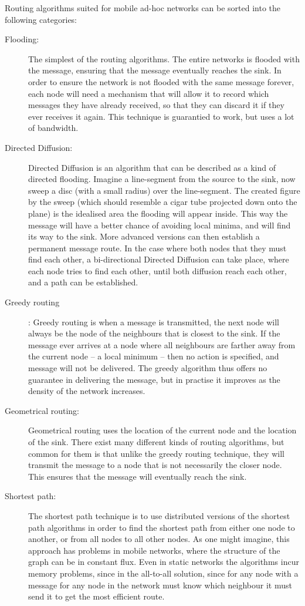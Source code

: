 \documentclass[letter, 12pt, english, draft]{article}
\begin{document}
Routing algorithms suited for mobile ad-hoc networks can be sorted into the following categories:
\begin{description}
\item[Flooding:] The simplest of the routing algorithms. The entire networks is flooded with the message, ensuring that the message eventually reaches the sink. In order to ensure the network is not flooded with the same message forever, each node will need a mechanism that will allow it to record which messages they have already received, so that they can discard it if they ever receives it again. This technique is guarantied to work, but uses a lot of bandwidth.

\item[Directed Diffusion:] Directed Diffusion is an algorithm that can be described as a kind of directed flooding. Imagine a line-segment from the source to the sink, now sweep a disc (with a small radius) over the line-segment. The created figure by the sweep (which should resemble a cigar tube projected down onto the plane) is the idealised area the flooding will appear inside. This way the message will have a better chance of avoiding local minima, and will find its way to the sink. More advanced versions can then establish a permanent message route. In the case where both nodes that they must find each other, a bi-directional Directed Diffusion can take place, where each node tries to find each other, until both diffusion reach each other, and a path can be established.

\item[Greedy routing]: Greedy routing is when a message is transmitted, the next node will always be the node of the neighbours that is closest to the sink. If the message ever arrives at a node where all neighbours are farther away from the current node -- a local minimum -- then no action is specified, and message will not be delivered. The greedy algorithm thus offers no guarantee in delivering the message, but in practise it improves as the density of the network increases.

\item[Geometrical routing:] Geometrical routing uses the location of the current node and the location of the sink. There exist many different kinds of routing algorithms, but common for them is that unlike the greedy routing technique, they will transmit the message to a node that is not necessarily the closer node. This ensures that the message will eventually reach the sink.
 
\item[Shortest path:] The shortest path technique is to use distributed versions of the shortest path algorithms in order to find the shortest path from either one node to another, or from all nodes to all other nodes. As one might imagine, this approach has problems in mobile networks, where the structure of the graph can be in constant flux. Even in static networks the algorithms incur memory problems, since in the all-to-all solution, since for any node with a message for any node in the network must know which neighbour it must send it to get the most efficient route.  
\end{description}
\end{document}
